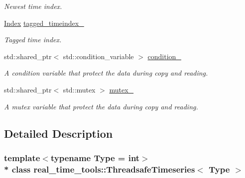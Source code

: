 \begin{DoxyCompactItemize}
\begin{DoxyCompactList}\small\item\em Newest time index. \end{DoxyCompactList}\item 
\hyperlink{classreal__time__tools_1_1ThreadsafeTimeseries_a9364696c534468d7ad927883b16ca981}{Index} \hyperlink{classreal__time__tools_1_1ThreadsafeTimeseries_a8ccddbf7eda7ac6ac257eaef39d9cbc4}{tagged\+\_\+timeindex\+\_\+}\hypertarget{classreal__time__tools_1_1ThreadsafeTimeseries_a8ccddbf7eda7ac6ac257eaef39d9cbc4}{}\label{classreal__time__tools_1_1ThreadsafeTimeseries_a8ccddbf7eda7ac6ac257eaef39d9cbc4}

\begin{DoxyCompactList}\small\item\em Tagged time index. \end{DoxyCompactList}\item 
std\+::shared\+\_\+ptr$<$ std\+::condition\+\_\+variable $>$ \hyperlink{classreal__time__tools_1_1ThreadsafeTimeseries_a46423f0837bcde91a274d49e9d8a32ee}{condition\+\_\+}\hypertarget{classreal__time__tools_1_1ThreadsafeTimeseries_a46423f0837bcde91a274d49e9d8a32ee}{}\label{classreal__time__tools_1_1ThreadsafeTimeseries_a46423f0837bcde91a274d49e9d8a32ee}

\begin{DoxyCompactList}\small\item\em A condition variable that protect the data during copy and reading. \end{DoxyCompactList}\item 
std\+::shared\+\_\+ptr$<$ std\+::mutex $>$ \hyperlink{classreal__time__tools_1_1ThreadsafeTimeseries_a755bd4c399df29f2f9b9d2ed748dfae5}{mutex\+\_\+}\hypertarget{classreal__time__tools_1_1ThreadsafeTimeseries_a755bd4c399df29f2f9b9d2ed748dfae5}{}\label{classreal__time__tools_1_1ThreadsafeTimeseries_a755bd4c399df29f2f9b9d2ed748dfae5}

\begin{DoxyCompactList}\small\item\em A mutex variable that protect the data during copy and reading. \end{DoxyCompactList}\end{DoxyCompactItemize}


\subsection{Detailed Description}
\subsubsection*{template$<$typename Type = int$>$\\*
class real\+\_\+time\+\_\+tools\+::\+Threadsafe\+Timeseries$<$ Type $>$}

